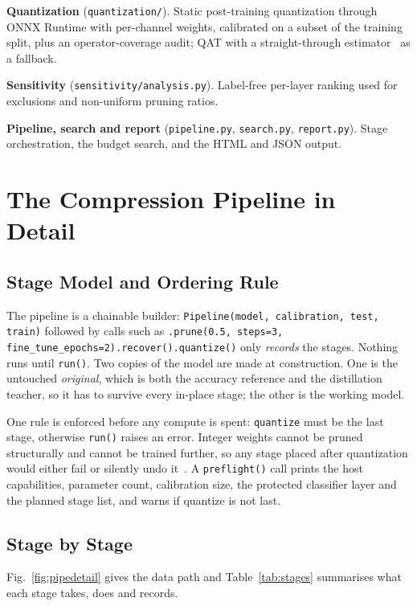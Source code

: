 \documentclass[oneside,a4paper,12pt]{report}
\newcommand{\code}[1]{\texttt{\small #1}}
\begin{document}
\textbf{Quantization} (\code{quantization/}). Static post-training quantization through ONNX Runtime with per-channel weights, calibrated on a subset of the training split, plus an operator-coverage audit; QAT with a straight-through estimator~\cite{bengio2013} as a fallback.

\textbf{Sensitivity} (\code{sensitivity/analysis.py}). Label-free per-layer ranking used for exclusions and non-uniform pruning ratios.

\textbf{Pipeline, search and report} (\code{pipeline.py}, \code{search.py}, \code{report.py}). Stage orchestration, the budget search, and the HTML and JSON output.

\section{The Compression Pipeline in Detail}
\subsection{Stage Model and Ordering Rule}
\begin{sloppypar}
The pipeline is a chainable builder: \code{Pipeline(model, calibration, test, train)} followed by calls such as \code{.prune(0.5, steps=3, fine\_tune\_epochs=2)}\allowbreak\code{.recover().quantize()} only \emph{records} the stages. Nothing runs until \code{run()}. Two copies of the model are made at construction. One is the untouched \emph{original}, which is both the accuracy reference and the distillation teacher, so it has to survive every in-place stage; the other is the working model.
\end{sloppypar}

One rule is enforced before any compute is spent: \code{quantize} must be the last stage, otherwise \code{run()} raises an error. Integer weights cannot be pruned structurally and cannot be trained further, so any stage placed after quantization would either fail or silently undo it~\cite{chae2026}. A \code{preflight()} call prints the host capabilities, parameter count, calibration size, the protected classifier layer and the planned stage list, and warns if quantize is not last.

\subsection{Stage by Stage}
Fig.~\ref{fig:pipedetail} gives the data path and Table~\ref{tab:stages} summarises what each stage takes, does and records.
\end{document}
